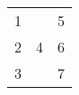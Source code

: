 \begin{tabular}{rrr}
\multirow{2}[0]{*}{1} &
  \multirow{5}[0]{*}{4} &
  5
  \\
 &
   &
  \multirow{3}[0]{*}{6}
  \\
2 &
   &
  
  \\
\multirow{2}[0]{*}{3} &
   &
  
  \\
 &
   &
  7
  \\
\end{tabular}%
